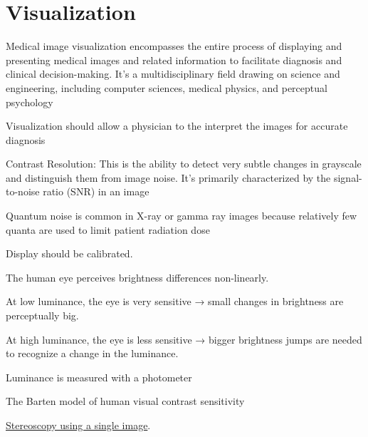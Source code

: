 \chapter{Visualization}
Medical image visualization encompasses the entire process of displaying and presenting medical images and related information to facilitate diagnosis and clinical decision-making. It's a multidisciplinary field drawing on science and engineering, including computer sciences, medical physics, and perceptual psychology

Visualization should allow a physician to the interpret the images for accurate diagnosis

Contrast Resolution: This is the ability to detect very subtle changes in grayscale and distinguish them from image noise. It's primarily characterized by the signal-to-noise ratio (SNR) in an image

Quantum noise is common in X-ray or gamma ray images because relatively few quanta are used to limit patient radiation dose

Display should be calibrated.

The human eye perceives brightness differences non-linearly.

At low luminance, the eye is very sensitive → small changes in brightness are perceptually big.

At high luminance, the eye is less sensitive → bigger brightness jumps are needed to recognize a change in the luminance.

Luminance is measured with a photometer

The Barten model of human visual contrast sensitivity


\href{https://en.wikipedia.org/wiki/Stereoscopy}{Stereoscopy using a single image}.